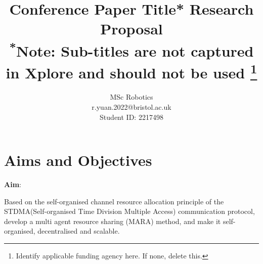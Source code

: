 \documentclass[conference]{IEEEtran}
\begin{document}
\title{Conference Paper Title* Research Proposal\\
{\footnotesize \textsuperscript{*}Note: Sub-titles are not captured in Xplore and
should not be used}
\thanks{Identify applicable funding agency here. If none, delete this.}
}

\author{
MSc Robotics \\
r.yuan.2022@bristol.ac.uk\\
Student ID:  2217498\\

}



\maketitle



\section{Aims and Objectives}



\textbf{Aim}:



Based on the self-organised channel resource allocation principle of the STDMA(Self-organised Time Division Multiple Access) \cite{STDMA} communication protocol, develop a multi agent resource sharing (MARA) \cite{MARA_Overview1} method, and make it self-organised, decentralised and scalable. 
    
\end{document}
